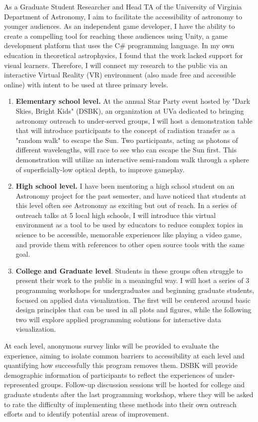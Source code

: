 \documentclass[11pt]{article}
\begin{document}
As a Graduate Student Researcher and Head TA of the University of Virginia Department of Astronomy, I aim to facilitate the accessibility of astronomy to younger audiences. As an independent game developer, I have the ability to create a compelling tool for reaching these audiences using Unity, a game development platform that uses the C\# programming language. In my own education in theoretical astrophysics, I found that the work lacked support for visual learners. Therefore, I will connect my research to the public via an interactive Virtual Reality (VR) environment (also made free and accessible online) with intent to be used at three primary levels.
\begin{enumerate}[itemsep=-0.15cm, topsep=0cm]
    \item \textbf{Elementary school level.} At the annual Star Party event hosted by "Dark Skies, Bright Kids" (DSBK), an organization at UVa dedicated to bringing astronomy outreach to under-served groups, I will host a demonstration table that will introduce participants to the concept of radiation transfer as a "random walk" to escape the Sun. Two participants, acting as photons of different wavelengths, will race to see who can escape the Sun first. This demonstration will utilize an interactive semi-random walk through a sphere of superficially-low optical depth, to improve gameplay.
    \item \textbf{High school level.} I have been mentoring a high school student on an Astronomy project for the past semester, and have noticed that students at this level often see Astronomy as exciting but out of reach. In a series of outreach talks at 5 local high schools, I will introduce this virtual environment as a tool to be used by educators to reduce complex topics in science to be accessible, memorable experiences like playing a video game, and provide them with references to other open source tools with the same goal.
    \item \textbf{College and Graduate level}. Students in these groups often struggle to present their work to the public in a meaningful way. I will host a series of 3 programming workshops for undergraduates and beginning graduate students, focused on applied data visualization. The first will be centered around basic design principles that can be used in all plots and figures, while the following two will explore applied programming solutions for interactive data visualization.
\end{enumerate}
At each level, anonymous survey links will be provided to evaluate the experience, aiming to isolate common barriers to accessibility at each level and quantifying how successfully this program removes them. DSBK will provide demographic information of participants to reflect the experiences of under-represented groups. Follow-up discussion sessions will be hosted for college and graduate students after the last programming workshop, where they will be asked to rate the difficulty of implementing these methods into their own outreach efforts and to identify potential areas of improvement.

\renewcommand\refname{\vskip -1cm}


\end{document}
